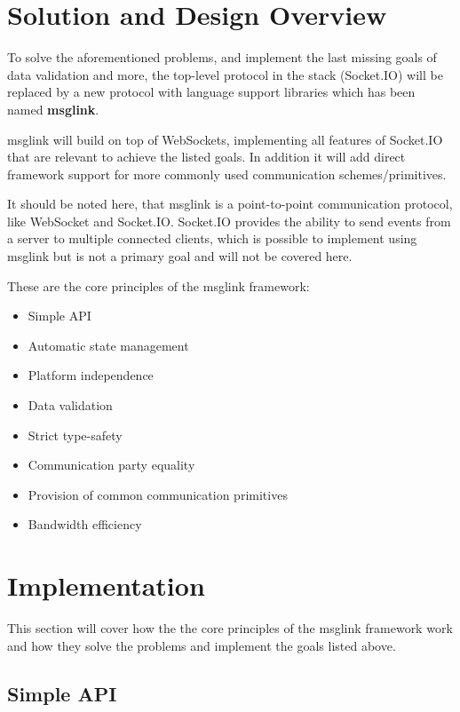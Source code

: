 \documentclass[conference]{IEEEtran}
\begin{document}
\section{Solution and Design Overview}

To solve the aforementioned problems, and implement the last missing goals of data validation and more, the top-level protocol in the stack (Socket.IO) will be replaced by a new protocol with language support libraries which has been named \textbf{msglink}.

msglink will build on top of WebSockets, implementing all features of Socket.IO that are relevant to achieve the listed goals. In addition it will add direct framework support for more commonly used communication schemes/primitives.

It should be noted here, that msglink is a point-to-point communication protocol, like WebSocket and Socket.IO. Socket.IO provides the ability to send events from a server to multiple connected clients, which is possible to implement using msglink but is not a primary goal and will not be covered here.

These are the core principles of the msglink framework:

\begin{itemize}
    \item Simple API
    \item Automatic state management
    \item Platform independence
    \item Data validation
    \item Strict type-safety
    \item Communication party equality
    \item Provision of common communication primitives
    \item Bandwidth efficiency
\end{itemize}


\section{Implementation}

This section will cover how the the core principles of the msglink framework work and how they solve the problems and implement the goals listed above.


\subsection{Simple API}
\end{document}
